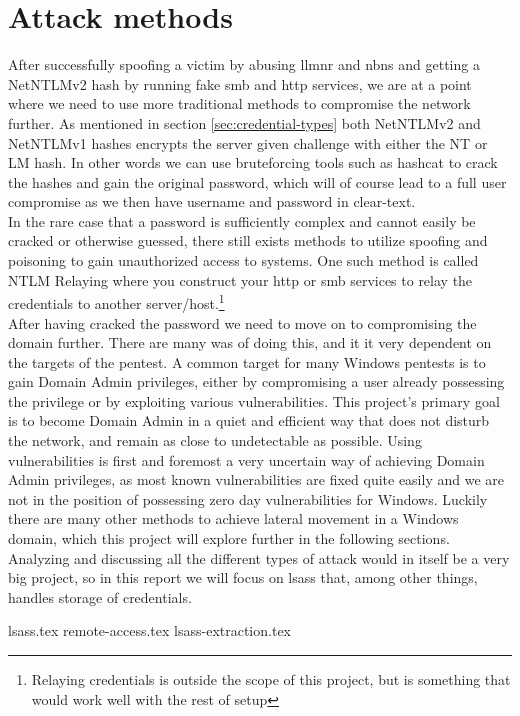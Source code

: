 \documentclass{article}
\begin{document}
\section{Attack methods}
\label{sec:attack-methods}
After successfully spoofing a victim by abusing \gls{llmnr} and \gls{nbns} and getting a NetNTLMv2 hash by running fake \gls{smb} and \gls{http} services, we are at a point where we need to use more traditional methods to compromise the network further. As mentioned in section \ref{sec:credential-types} both NetNTLMv2 and NetNTLMv1 hashes encrypts the server given challenge with either the NT or LM hash. In other words we can use bruteforcing tools such as hashcat\cite{url:hashes:hashcat-example-hashes} to crack the hashes and gain the original password, which will of course lead to a full user compromise as we then have username and password in clear-text.
\\
In the rare case that a password is sufficiently complex and cannot easily be cracked or otherwise guessed, there still exists methods to utilize spoofing and poisoning to gain unauthorized access to systems. One such method is called NTLM Relaying\cite{url:ntlm-relaying} where you construct your \gls{http} or \gls{smb} services to relay the credentials to another server/host.\footnote{Relaying credentials is outside the scope of this project, but is something that would work well with the rest of setup}
\\
After having cracked the password we need to move on to compromising the domain further. There are many was of doing this, and it it very dependent on the targets of the pentest. A common target for many Windows pentests is to gain Domain Admin privileges, either by compromising a user already possessing the privilege or by exploiting various vulnerabilities. This project's primary goal is to become Domain Admin in a quiet and efficient way that does not disturb the network, and remain as close to undetectable as possible. Using vulnerabilities is first and foremost a very uncertain way of achieving Domain Admin privileges, as most known vulnerabilities are fixed quite easily and we are not in the position of possessing zero day vulnerabilities for Windows. Luckily there are many other methods to achieve lateral movement in a Windows domain, which this project will explore further in the following sections. Analyzing and discussing all the different types of attack would in itself be a very big project, so in this report we will focus on \gls{lsass} that, among other things, handles storage of credentials.

{lsass.tex}
{remote-access.tex}
{lsass-extraction.tex}
\end{document}
